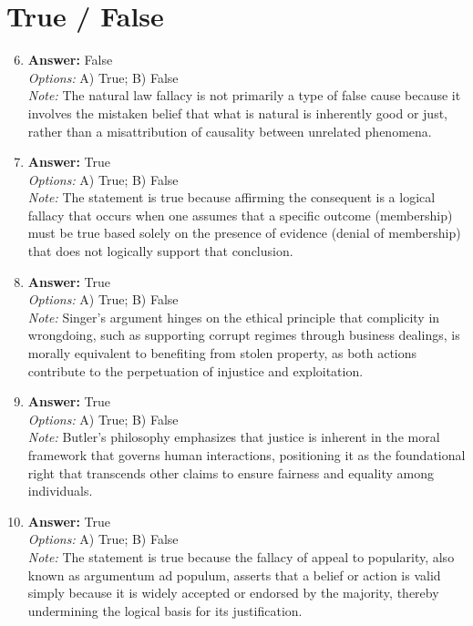 \documentclass[12pt]{article}
\begin{document}
\section*{True / False}
\begin{enumerate}[label=\arabic*.]
\setcounter{enumi}{5}
\item \textbf{Answer:} False
\\ \textit{Options:} A) True; B) False
\\ \textit{Note:} The natural law fallacy is not primarily a type of false cause because it involves the mistaken belief that what is natural is inherently good or just, rather than a misattribution of causality between unrelated phenomena.
\item \textbf{Answer:} True
\\ \textit{Options:} A) True; B) False
\\ \textit{Note:} The statement is true because affirming the consequent is a logical fallacy that occurs when one assumes that a specific outcome (membership) must be true based solely on the presence of evidence (denial of membership) that does not logically support that conclusion.
\item \textbf{Answer:} True
\\ \textit{Options:} A) True; B) False
\\ \textit{Note:} Singer's argument hinges on the ethical principle that complicity in wrongdoing, such as supporting corrupt regimes through business dealings, is morally equivalent to benefiting from stolen property, as both actions contribute to the perpetuation of injustice and exploitation.
\item \textbf{Answer:} True
\\ \textit{Options:} A) True; B) False
\\ \textit{Note:} Butler's philosophy emphasizes that justice is inherent in the moral framework that governs human interactions, positioning it as the foundational right that transcends other claims to ensure fairness and equality among individuals.
\item \textbf{Answer:} True
\\ \textit{Options:} A) True; B) False
\\ \textit{Note:} The statement is true because the fallacy of appeal to popularity, also known as argumentum ad populum, asserts that a belief or action is valid simply because it is widely accepted or endorsed by the majority, thereby undermining the logical basis for its justification.
\end{enumerate}
\end{document}
